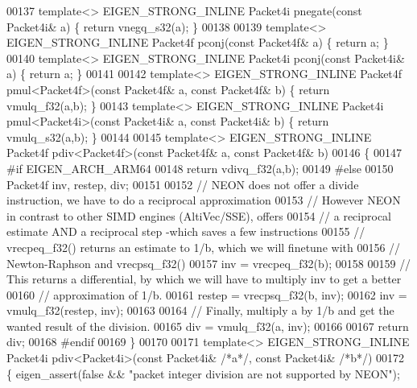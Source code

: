 \begin{DoxyCode}
{00137 \textcolor{keyword}{template}<> EIGEN\_STRONG\_INLINE Packet4i pnegate(\textcolor{keyword}{const} Packet4i& a) \{ \textcolor{keywordflow}{return} vnegq\_s32(a); \}
00138 
00139 \textcolor{keyword}{template}<> EIGEN\_STRONG\_INLINE Packet4f pconj(\textcolor{keyword}{const} Packet4f& a) \{ \textcolor{keywordflow}{return} a; \}
00140 \textcolor{keyword}{template}<> EIGEN\_STRONG\_INLINE Packet4i pconj(\textcolor{keyword}{const} Packet4i& a) \{ \textcolor{keywordflow}{return} a; \}
00141 
00142 \textcolor{keyword}{template}<> EIGEN\_STRONG\_INLINE Packet4f pmul<Packet4f>(\textcolor{keyword}{const} Packet4f& a, \textcolor{keyword}{const} Packet4f& b) \{ \textcolor{keywordflow}{return} 
      vmulq\_f32(a,b); \}
00143 \textcolor{keyword}{template}<> EIGEN\_STRONG\_INLINE Packet4i pmul<Packet4i>(\textcolor{keyword}{const} Packet4i& a, \textcolor{keyword}{const} Packet4i& b) \{ \textcolor{keywordflow}{return} 
      vmulq\_s32(a,b); \}
00144 
00145 \textcolor{keyword}{template}<> EIGEN\_STRONG\_INLINE Packet4f pdiv<Packet4f>(\textcolor{keyword}{const} Packet4f& a, \textcolor{keyword}{const} Packet4f& b)
00146 \{
00147 \textcolor{preprocessor}{#if EIGEN\_ARCH\_ARM64}
00148   \textcolor{keywordflow}{return} vdivq\_f32(a,b);
00149 \textcolor{preprocessor}{#else}
00150   Packet4f inv, restep, div;
00151 
00152   \textcolor{comment}{// NEON does not offer a divide instruction, we have to do a reciprocal approximation}
00153   \textcolor{comment}{// However NEON in contrast to other SIMD engines (AltiVec/SSE), offers}
00154   \textcolor{comment}{// a reciprocal estimate AND a reciprocal step -which saves a few instructions}
00155   \textcolor{comment}{// vrecpeq\_f32() returns an estimate to 1/b, which we will finetune with}
00156   \textcolor{comment}{// Newton-Raphson and vrecpsq\_f32()}
00157   inv = vrecpeq\_f32(b);
00158 
00159   \textcolor{comment}{// This returns a differential, by which we will have to multiply inv to get a better}
00160   \textcolor{comment}{// approximation of 1/b.}
00161   restep = vrecpsq\_f32(b, inv);
00162   inv = vmulq\_f32(restep, inv);
00163 
00164   \textcolor{comment}{// Finally, multiply a by 1/b and get the wanted result of the division.}
00165   div = vmulq\_f32(a, inv);
00166 
00167   \textcolor{keywordflow}{return} div;
00168 \textcolor{preprocessor}{#endif}
00169 \}
00170 
00171 \textcolor{keyword}{template}<> EIGEN\_STRONG\_INLINE Packet4i pdiv<Packet4i>(\textcolor{keyword}{const} Packet4i& \textcolor{comment}{/*a*/}, \textcolor{keyword}{const} Packet4i& \textcolor{comment}{/*b*/})
00172 \{ eigen\_assert(\textcolor{keyword}{false} && \textcolor{stringliteral}{"packet integer division are not supported by NEON"});
}
\end{DoxyCode}
